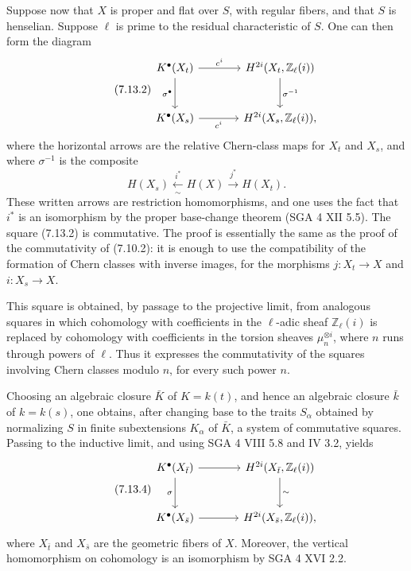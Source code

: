 \documentclass[11pt]{article}
\begin{document}
Suppose now that \(X\) is proper and flat over \(S\), with regular fibers, and that \(S\) is henselian. Suppose \(\ell\) is prime to the residual characteristic of \(S\). One can then form the diagram
\begin{equation}\tag{7.13.2}
\begin{tikzcd}[column sep=large,row sep=large]
K^\bullet(X_t) \arrow[r,"c^i"] \arrow[d,"\sigma^\bullet"'] &
H^{2i}(X_t,\mathbb Z_\ell(i)) \arrow[d,"\sigma^{-1}"]\\
K^\bullet(X_s) \arrow[r,"c^i"'] &
H^{2i}(X_s,\mathbb Z_\ell(i)),
\end{tikzcd}
\end{equation}
where the horizontal arrows are the relative Chern-class maps for \(X_t\) and \(X_s\), and where \(\sigma^{-1}\) is the composite
\[
  H(X_s)\xleftarrow[\sim]{i^*}H(X)\xrightarrow{j^*}H(X_t).
\]
These written arrows are restriction homomorphisms, and one uses the fact that \(i^*\) is an isomorphism by the proper base-change theorem (SGA 4 XII 5.5). The square (7.13.2) is commutative. The proof is essentially the same as the proof of the commutativity of (7.10.2): it is enough to use the compatibility of the formation of Chern classes with inverse images, for the morphisms \(j:X_t\to X\) and \(i:X_s\to X\).

This square is obtained, by passage to the projective limit, from analogous squares in which cohomology with coefficients in the \(\ell\)-adic sheaf \(\mathbb Z_\ell(i)\) is replaced by cohomology with coefficients in the torsion sheaves \(\mu_n^{\otimes i}\), where \(n\) runs through powers of \(\ell\). Thus it expresses the commutativity of the squares involving Chern classes modulo \(n\), for every such power \(n\).

Choosing an algebraic closure \(\bar K\) of \(K=k(t)\), and hence an algebraic closure \(\bar k\) of \(k=k(s)\), one obtains, after changing base to the traits \(S_\alpha\) obtained by normalizing \(S\) in finite subextensions \(K_\alpha\) of \(\bar K\), a system of commutative squares. Passing to the inductive limit, and using SGA 4 VIII 5.8 and IV 3.2, yields
\begin{equation}\tag{7.13.4}
\begin{tikzcd}[column sep=large,row sep=large]
K^\bullet(X_{\bar t}) \arrow[r] \arrow[d,"\sigma"'] &
H^{2i}(X_{\bar t},\mathbb Z_\ell(i)) \arrow[d,"\sim"]\\
K^\bullet(X_{\bar s}) \arrow[r] &
H^{2i}(X_{\bar s},\mathbb Z_\ell(i)),
\end{tikzcd}
\end{equation}
where \(X_{\bar t}\) and \(X_{\bar s}\) are the geometric fibers of \(X\). Moreover, the vertical homomorphism on cohomology is an isomorphism by SGA 4 XVI 2.2.
\end{document}
